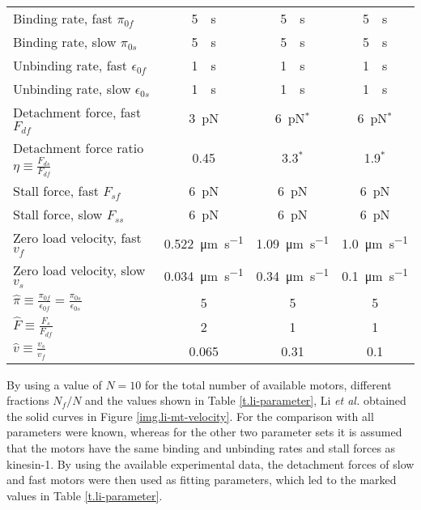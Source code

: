 \begin{table}[htbp]
\begin{tabular}{L{0.3\textwidth}ccc}
	Binding rate, fast $\pi_{0f}$ & \SI{5}{\per\second} & \SI{5}{\per\second} & \SI{5}{\per\second} \\
	Binding rate, slow $\pi_{0s}$ & \SI{5}{\per\second} & \SI{5}{\per\second} & \SI{5}{\per\second} \\
	Unbinding rate, fast $\epsilon_{0f}$ & \SI{1}{\per\second} & \SI{1}{\per\second} & \SI{1}{\per\second} \\	
	Unbinding rate, slow $\epsilon_{0s}$ & \SI{1}{\per\second} & \SI{1}{\per\second} & \SI{1}{\per\second} \\	
	Detachment force, fast $F_{df}$ & \SI{3}{\pico\newton} & \SI{6}{\pico\newton}$^{*}$ & \SI{6}{\pico\newton}$^{*}$ \\
	Detachment force ratio $\eta \equiv \frac{F_{ds}}{F_{df}}$ & 0.45 & 3.3$^{*}$ & 1.9$^{*}$ \\
	Stall force, fast $F_{sf}$ & \SI{6}{\pico\newton} & \SI{6}{\pico\newton} & \SI{6}{\pico\newton} \\
	Stall force, slow $F_{ss}$ & \SI{6}{\pico\newton} & \SI{6}{\pico\newton} & \SI{6}{\pico\newton} \\
	Zero load velocity, fast $v_{f}$ & \SI{0,522}{\micro\meter\per\second} & \SI{1,09}{\micro\meter\per\second} & \SI{1,0}{\micro\meter\per\second} \\
	Zero load velocity, slow $v_{s}$ & \SI{0,034}{\micro\meter\per\second} & \SI{0,34}{\micro\meter\per\second} & \SI{0,1}{\micro\meter\per\second} \\
	$\hat{\pi} \equiv \frac{\pi_{0f}}{\epsilon_{0f}} = \frac{\pi_{0s}}{\epsilon_{0s}}$ & 5 & 5 & 5 \\
	$\hat{F} \equiv \frac{F_{s}}{F_{df}}$ & 2 & 1 & 1 \\
	$\hat{v} \equiv \frac{v_{s}}{v_{f}}$ & 0.065 & 0.31 & 0.1 \\ \hline
\end{tabular}
\end{table}

By using a value of \mbox{$N = 10$} for the total number of available motors, different fractions $N_f/N$ and the values shown in Table \ref{t.li-parameter}, Li \textit{et al.} \cite{li} obtained
the solid curves in Figure \ref{img.li-mt-velocity}. For the comparison with \cite{larson} all parameters were known, whereas for the other two parameter sets it is assumed that the motors have
the same binding and unbinding rates and stall forces as kinesin-1. By using the available experimental data, the detachment forces of slow and fast motors were then used as fitting parameters,
which led to the marked values in Table \ref{t.li-parameter}.

